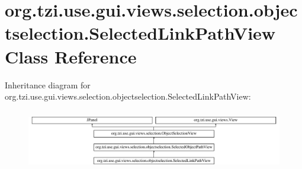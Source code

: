 \hypertarget{classorg_1_1tzi_1_1use_1_1gui_1_1views_1_1selection_1_1objectselection_1_1_selected_link_path_view}{\section{org.\-tzi.\-use.\-gui.\-views.\-selection.\-objectselection.\-Selected\-Link\-Path\-View Class Reference}
\label{classorg_1_1tzi_1_1use_1_1gui_1_1views_1_1selection_1_1objectselection_1_1_selected_link_path_view}
}
Inheritance diagram for org.\-tzi.\-use.\-gui.\-views.\-selection.\-objectselection.\-Selected\-Link\-Path\-View\-:\begin{figure}[H]
\begin{center}
\leavevmode
\includegraphics[height=2.660333cm]{classorg_1_1tzi_1_1use_1_1gui_1_1views_1_1selection_1_1objectselection_1_1_selected_link_path_view}
\end{center}
\end{figure}
